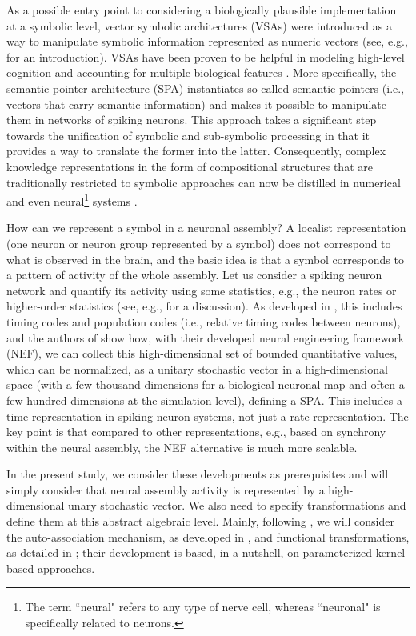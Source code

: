 \documentclass[sn-mathphys]{sn-jnl}
\begin{document}
As a possible entry point to considering a biologically plausible implementation at a symbolic level, vector symbolic architectures (VSAs) were introduced as a way to manipulate symbolic information represented as numeric vectors (see, e.g., \cite{levy_vector_2008} for an introduction). VSAs have been proven to be helpful in modeling high-level cognition and accounting for multiple biological features \cite{gayler_vector_2003,eliasmith_how_2013}. More specifically, the semantic pointer architecture (SPA) \cite{eliasmith_how_2013} instantiates so-called semantic pointers (i.e., vectors that carry semantic information) and makes it possible to manipulate them in networks of spiking neurons. This approach takes a significant step towards the unification of symbolic and sub-symbolic processing in that it provides a way to translate the former into the latter. Consequently, complex knowledge representations in the form of compositional structures that are traditionally restricted to symbolic approaches can now be distilled in numerical and even neural\footnote{The term ``neural" refers to any type of nerve cell, whereas ``neuronal" is specifically related to neurons.} systems \cite{crawford_biologically_2016}.

How can we represent a symbol in a neuronal assembly? A localist representation (one neuron or neuron group represented by a symbol) does not correspond to what is observed in the brain, and the basic idea is that a symbol corresponds to a pattern of activity of the whole assembly. Let us consider a spiking neuron network and quantify its activity using some statistics, e.g., the neuron rates or higher-order statistics (see, e.g., \cite{cessac_dynamics_2008} for a discussion). As developed in \cite{eliasmith_neural_2002}, this includes timing codes and population codes (i.e., relative timing codes between neurons), and the authors of \cite{eliasmith_neural_2002} show how, with their developed neural engineering framework (NEF), we can collect this high-dimensional set of bounded quantitative values, which can be normalized, as a unitary stochastic vector in a high-dimensional space (with a few thousand dimensions for a biological neuronal map and often a few hundred dimensions at the simulation level), defining a SPA. This includes a time representation in spiking neuron systems, not just a rate representation. The key point is that compared to other representations, e.g., based on synchrony within the neural assembly, the NEF alternative is much more scalable.

In the present study, we consider these developments as prerequisites and will simply consider that neural assembly activity is represented by a high-dimensional unary stochastic vector. We also need to specify transformations and define them at this abstract algebraic level. Mainly, following \cite{mercier_ontology_2021}, we will consider the auto-association mechanism, as developed in \cite{stewart_biologically_2011}, and functional transformations, as detailed in \cite{eliasmith_neural_2002}; their development is based, in a nutshell, on parameterized kernel-based approaches.
\end{document}
